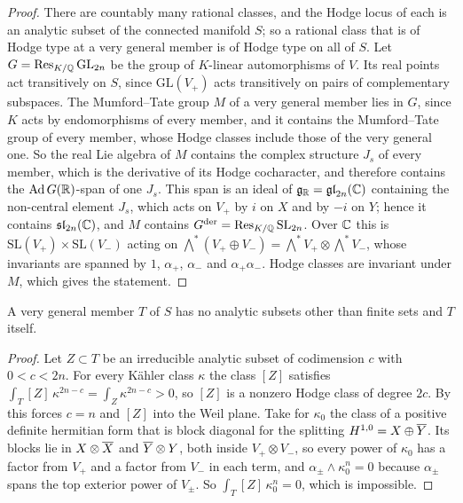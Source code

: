 \begin{proof}
There are countably many rational classes, and the Hodge locus of each is an
analytic subset of the connected manifold $S$; so a rational class that is of
Hodge type at a very general member is of Hodge type on all of $S$.
Let $G=\operatorname{Res}_{K/\mathbb{Q}}\mathrm{GL}_{2n}$ be the group of $K$-linear automorphisms
of $V$. Its real points act transitively on $S$, since
$\mathrm{GL}(V_{+})$ acts transitively on pairs of complementary subspaces.
The Mumford--Tate group $M$ of a very general member lies in $G$, since $K$
acts by endomorphisms of every member, and it contains the Mumford--Tate group
of every member, whose Hodge classes include those of the very general one.
So the real Lie algebra of $M$ contains the complex structure $J_{s}$ of every
member, which is the derivative of its Hodge cocharacter, and therefore
contains the $\mathrm{Ad}\,G(\mathbb{R})$-span of one $J_{s}$. This span is an ideal of
$\mathfrak{g}_{\mathbb{R}}=\mathfrak{gl}_{2n}(\mathbb{C})$ containing the non-central
element $J_{s}$, which acts on $V_{+}$ by $i$ on $X$ and by $-i$ on $Y$; hence
it contains $\mathfrak{sl}_{2n}(\mathbb{C})$, and $M$ contains
$G^{\mathrm{der}}=\operatorname{Res}_{K/\mathbb{Q}}\mathrm{SL}_{2n}$. Over $\mathbb{C}$ this is
$\mathrm{SL}(V_{+})\times\mathrm{SL}(V_{-})$ acting on
$\bigwedge^{*}(V_{+}\oplus V_{-})=\bigwedge^{*}V_{+}\otimes\bigwedge^{*}V_{-}$,
whose invariants are spanned by $1$, $\alpha_{+}$, $\alpha_{-}$ and
$\alpha_{+}\alpha_{-}$. Hodge classes are invariant under $M$, which gives
the statement.
\end{proof}

\begin{lemma}
\label{lem:weiltorussubsets}
A very general member $T$ of $S$ has no analytic subsets other than finite
sets and $T$ itself.
\end{lemma}

\begin{proof}
Let $Z\subset T$ be an irreducible analytic subset of codimension $c$ with
$0<c<2n$. For every K\"ahler class $\kappa$ the class $[Z]$ satisfies
$\int_{T}[Z]\,\kappa^{2n-c}=\int_{Z}\kappa^{2n-c}>0$, so $[Z]$ is a nonzero
Hodge class of degree $2c$. By  this forces $c=n$ and
$[Z]$ into the Weil plane. Take for $\kappa_{0}$ the class of a positive
definite hermitian form that is block diagonal for the splitting
$H^{1,0}=X\oplus\overline{Y}$. Its blocks lie in $X\otimes\overline{X}$ and
$\overline{Y}\otimes Y$, both inside $V_{+}\otimes V_{-}$, so every power of
$\kappa_{0}$ has a factor from $V_{+}$ and a factor from $V_{-}$ in each term,
and $\alpha_{\pm}\wedge\kappa_{0}^{n}=0$ because $\alpha_{\pm}$ spans the top
exterior power of $V_{\pm}$. So
$\int_{T}[Z]\,\kappa_{0}^{n}=0$, which is impossible.
\end{proof}

